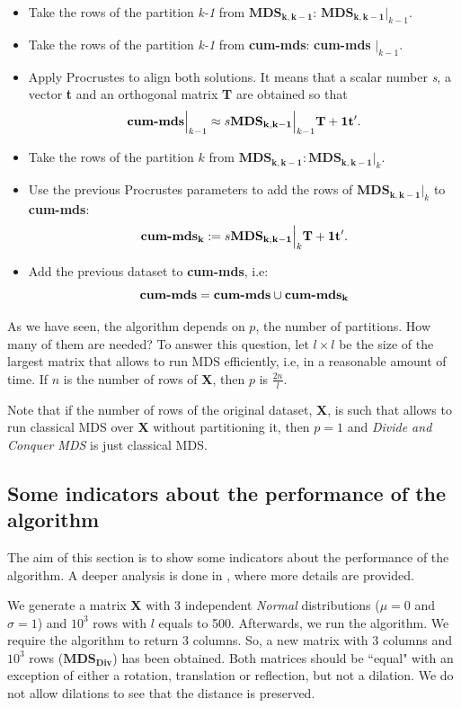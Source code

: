 \documentclass[11pt]{report}
\begin{document}
\begin{itemize}
\begin{itemize}
\item Take the rows of the partition \textit{k-1} from $\mathbf{MDS_{k, k-1}}$: 
$\mathbf{MDS_{k, k-1}} \Bigr|_{k-1}$.
\item Take the rows of the partition \textit{k-1} from \textbf{cum-mds}: 
\textbf{cum-mds} $\Bigr|_{k-1}$.
\item Apply Procrustes to align both solutions. It means that a scalar number
\textit{s}, a vector \textbf{t} and an orthogonal matrix \textbf{T} are obtained
so that
\[
\textbf{\mbox{cum-mds}} \Bigr|_{k-1} \approx s \mathbf{MDS_{k, k-1}} \Bigr|_{k-1} \mathbf{T} + \mathbf{1t'}.
\]
\item Take the rows of the partition $k$ from $\mathbf{MDS_{k, k-1}}: \mathbf{MDS_{k, k-1}} \Bigr|_{k}$.
\item Use the previous Procrustes parameters to add the rows of 
$\mathbf{MDS_{k, k-1}} \Bigr|_{k}$ to \textbf{cum-mds}:
\[
\textbf{\mbox{cum-mds}}_\textbf{k} := s \mathbf{MDS_{k, k-1}} \Bigr|_{k} \mathbf{T} + \mathbf{1t}'.
\]
\item Add the previous dataset to \textbf{cum-mds}, i.e:
\[
\textbf{\mbox{cum-mds}} = \textbf{\mbox{cum-mds}} \cup \textbf{\mbox{cum-mds}}_\textbf{k}
\]

\end{itemize}
\end{itemize}

As we have seen, the algorithm depends on $p$, the number of partitions. How 
many of them are needed? To answer this question, let $l \times l$ be the 
size of the largest matrix that allows to run MDS efficiently, i.e, in a 
reasonable amount of time. If $n$ is the number of rows 
of \textbf{X}, then $p$ is $\frac{2n}{l}$. 

\indent Note that if the number of rows of the original dataset, \textbf{X}, 
is such that allows to run classical MDS over \textbf{X} without partitioning 
it, then $p=1$ and \textit{Divide and Conquer MDS} is just classical MDS.


\subsection{Some indicators about the performance of the algorithm}
\label{chap:ind_div}
The aim of this section is to show some indicators about the performance of the
algorithm. A deeper analysis is done in , where more details are
provided.

\indent We generate a matrix \textbf{X} with 3 independent \textit{Normal} 
distributions ($\mu = 0$ and $\sigma = 1$) and $10^3$ rows with $l$ equals to 500. 
Afterwards, we run the algorithm. We require the algorithm to 
return 3 columns. So, a new matrix with 3 columns and $10^3$ rows 
($\mathbf{MDS_{Div}}$) has been obtained. Both matrices should be ``equal" 
with an exception of either a rotation, translation or reflection, but 
not a dilation. We do not allow dilations to see that the distance is 
preserved.
\end{document}
